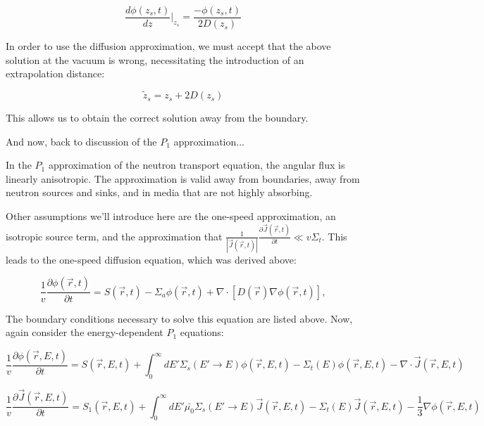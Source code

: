 \documentclass[12pt]{article}
\newcommand{\rvec}{\ensuremath{\vec{r}}}
\begin{document}
\begin{equation*}
\frac{d\phi(z_s,t)}{dz}\Bigr|_{z_s} = \frac{-\phi(z_s,t)}{2D(z_s)}
\end{equation*}

In order to use the diffusion approximation, we must accept that the above solution at the vacuum is 
wrong, necessitating the introduction of an extrapolation distance:

\begin{equation*}
\tilde{z}_s = z_s + 2D(z_s)
\end{equation*}

This allows us to obtain the correct solution away from the boundary.


And now, back to discussion of the $P_1$ approximation...


In the $P_1$ approximation of the neutron transport equation, the angular flux is linearly anisotropic.
The approximation is valid away from boundaries, away from neutron sources and sinks, and in media that 
are not highly absorbing.

Other assumptions we'll introduce here are the one-speed approximation, an isotropic source term, and the
approximation that $\frac{1}{|\vec{J}(\rvec,t)|}\frac{\partial\vec{J}(\rvec,t)}{\partial t}\ll v\Sigma_t$.
This leads to the one-speed diffusion equation, which was derived above:

\begin{equation*}
\frac{1}{v}\frac{\partial\phi(\rvec,t)}{\partial t} = S(\rvec,t) - \Sigma_a\phi(\rvec,t) + 
\nabla\cdot[D(\rvec)\nabla\phi(\rvec,t)],
\end{equation*}

The boundary conditions necessary to solve this equation are listed above. Now, again consider the 
energy-dependent $P_1$ equations:

\begin{equation*}
\frac{1}{v}\frac{\partial\phi(\rvec,E,t)}{\partial t} = S(\rvec,E,t) + 
\int^{\infty}_0dE'\Sigma_s(E'\rightarrow E)\phi(\rvec,E,t) - 
\Sigma_t(E)\phi(\rvec,E,t) - \nabla\cdot\vec{J}(\rvec,E,t)
\end{equation*}

\begin{equation*}
\frac{1}{v}\frac{\partial \vec{J}(\rvec,E,t)}{\partial t} = S_1(\rvec,E,t) + 
\int^{\infty}_0dE'\bar{\mu_0}\Sigma_s(E'\rightarrow E)\vec{J}(\rvec,E,t) - 
\Sigma_t(E)\vec{J}(\rvec,E,t) - \frac{1}{3}\nabla\phi(\rvec,E,t)
\end{equation*}
\end{document}
